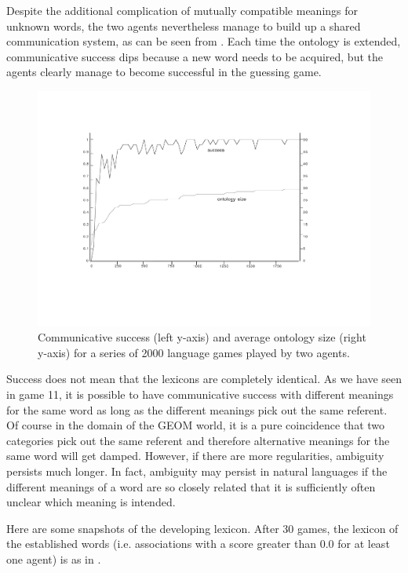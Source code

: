 Despite the additional complication of mutually 
compatible meanings for unknown words, the two agents
nevertheless manage to 
build up a shared communication system, as can be seen 
from . Each time the ontology is 
extended, communicative success dips because a new 
word needs to be acquired, but the agents clearly 
manage to become successful in the guessing game. 



\begin{figure}[htbp]
  \centerline{\includegraphics[width=.80\textwidth]{chap6/figs/gsucc3}}
\caption{\label{gsucc3} Communicative 
success (left y-axis) and average ontology size 
(right y-axis) for a series of 2000
language games played by two agents.} 
\end{figure}
Success does not mean that the lexicons are completely 
identical. As we have seen in game 11, it is possible
to have communicative success with different 
meanings for the same word as long as the different meanings
pick out the same referent. Of course in the domain of
the GEOM world, it is a pure coincidence that two categories
pick out the same referent and therefore alternative 
meanings for the same word will get damped. However, if there
are more regularities, ambiguity persists much longer. 
In fact, ambiguity may persist in natural languages if 
the different meanings of a word are so 
closely related that it is sufficiently often unclear
which meaning is intended. 

Here are some snapshots of the developing lexicon. 
After 30 games, the lexicon of the established
words (i.e. associations with a score greater 
than 0.0 for at least one agent) is as in . 



